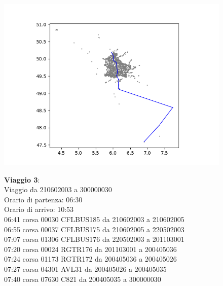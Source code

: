 \documentclass{article}
\begin{document}
\begin{figure}[H]
	\begin{minipage}{0.55\linewidth}
		\centering
		\hspace*{-6cm}\includegraphics[width=1.0\linewidth, valign=t]{figures/Figure_1}
	\end{minipage}
	\hspace*{-4cm}\begin{minipage}{0.7\linewidth}
		\textbf{Viaggio 3}:\\
		Viaggio da 210602003 a 300000030\\
		Orario di partenza: 06:30\\
		Orario di arrivo: 10:53\\
		06:41 corsa 00030 CFLBUS185 da 210602003 a 210602005\\
		06:55 corsa 00037 CFLBUS175 da 210602005 a 220502003\\
		07:07 corsa 01306 CFLBUS176 da 220502003 a 201103001\\
		07:20 corsa 00024 RGTR176 da 201103001 a 200405036\\
		07:24 corsa 01173 RGTR172 da 200405036 a 200405026\\
		07:27 corsa 04301 AVL31 da 200405026 a 200405035\\
		07:40 corsa 07630 C821 da 200405035 a 300000030
			\end{minipage}
\end{figure}
\end{document}
